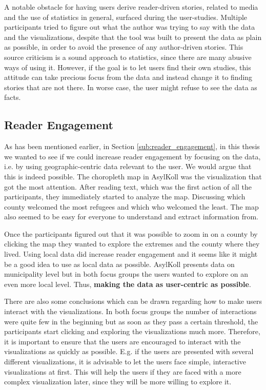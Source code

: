\documentclass{acmtog} %
\begin{document}
A notable obstacle for having users derive reader-driven stories, related to media and the use of statistics in general, surfaced during the user-studies. Multiple participants tried to figure out what the author was trying to say with the data and the visualizations, despite that the tool was built to present the data as plain as possible, in order to avoid the presence of any author-driven stories. This source criticism is a sound approach to statistics, since there are many abusive ways of using it. However, if the goal is to let users find their own studies, this attitude can take precious focus from the data and instead change it to finding stories that are not there. In worse case, the user might refuse to see the data as facts. 

\subsection{Reader Engagement}
\label{sub:disc_re}
As has been mentioned earlier, in Section \ref{sub:reader_engagement}, in this thesis we wanted to see if we could increase reader engagement by focusing on the data, i.e. by using geographic-centric data relevant to the user. We would argue that this is indeed possible. The choropleth map in AsylKoll was the visualization that got the most attention. After reading text, which was the first action of all the participants, they immediately started to analyze the map. Discussing which county welcomed the most refugees and which who welcomed the least. The map also seemed to be easy for everyone to understand and extract information from. 

Once the participants figured out that it was possible to zoom in on a county by clicking the map they wanted to explore the extremes and the county where they lived. Using local data did increase reader engagement and it seems like it might be a good idea to use as local data as possible. AsylKoll presents data on municipality level but in both focus groups the users wanted to explore on an even more local level. Thus, \textbf{making the data as user-centric as possible}. 

There are also some conclusions which can be drawn regarding how to make users interact with the visualizations. In both focus groups the number of interactions were quite few in the beginning but as soon as they pass a certain threshold, the participants start clicking and exploring the visualizations much more. Therefore, it is important to ensure that the users are encouraged to interact with the visualizations as quickly as possible. E.g. if the users are presented with several different visualizations, it is advisable to let the users face simple, interactive visualizations at first. This will help the users if they are faced with a more complex visualization later, since they will be more willing to explore it.
\end{document}
